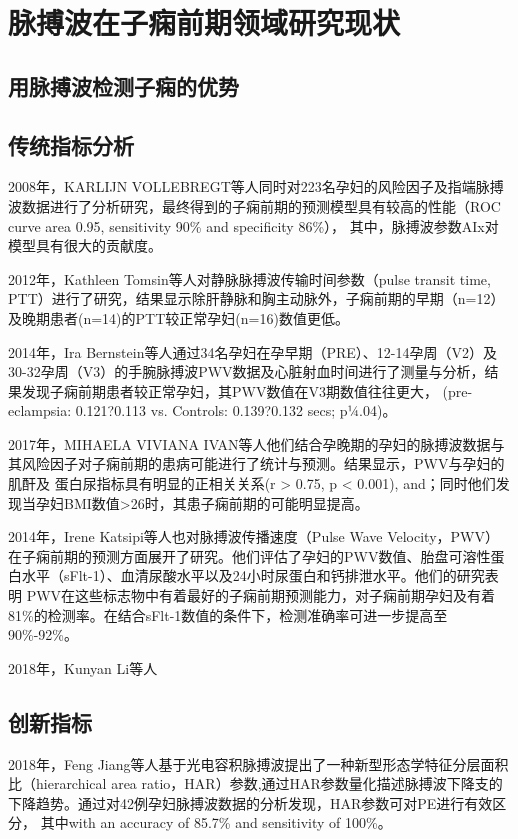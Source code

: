 \section{脉搏波在子痫前期领域研究现状}
\subsection{用脉搏波检测子痫的优势}

\subsection{传统指标分析}

2008年，KARLIJN VOLLEBREGT等人\cite{KARLIJN2008}同时对223名孕妇的风险因子及指端脉搏波数据进行了分析研究，最终得到的子痫前期的预测模型具有较高的性能（ROC curve area 0.95, sensitivity 90\% and specificity 86\%），
其中，脉搏波参数AIx对模型具有很大的贡献度。

2012年，Kathleen Tomsin等人\cite{Tomsin2012}对静脉脉搏波传输时间参数（pulse transit time, PTT）进行了研究，结果显示除肝静脉和胸主动脉外，子痫前期的早期（n=12）及晚期患者(n=14)的PTT较正常孕妇(n=16)数值更低。

2014年，Ira Bernstein等\cite{Ira2014}人通过34名孕妇在孕早期（PRE）、12-14孕周（V2）及30-32孕周（V3）的手腕脉搏波PWV数据及心脏射血时间进行了测量与分析，结果发现子痫前期患者较正常孕妇，其PWV数值在V3期数值往往更大，
(pre- eclampsia: 0.121?0.113 vs. Controls: 0.139?0.132 secs; p¼.04)。

2017年，MIHAELA VIVIANA IVAN等人\cite{VivianaIvan2018}他们结合孕晚期的孕妇的脉搏波数据与其风险因子对子痫前期的患病可能进行了统计与预测。结果显示，PWV与孕妇的肌酐及
蛋白尿指标具有明显的正相关关系(r > 0.75, p < 0.001), and；同时他们发现当孕妇BMI数值>26时，其患子痫前期的可能明显提高。

2014年，Irene Katsipi等人\cite{Katsipi2014}也对脉搏波传播速度（Pulse Wave Velocity，PWV）在子痫前期的预测方面展开了研究。他们评估了孕妇的PWV数值、胎盘可溶性蛋白水平（sFlt-1）、血清尿酸水平以及24小时尿蛋白和钙排泄水平。他们的研究表明
PWV在这些标志物中有着最好的子痫前期预测能力，对子痫前期孕妇及有着81\%的检测率。在结合sFlt-1数值的条件下，检测准确率可进一步提高至90\%-92\%。

2018年，Kunyan Li等人

\subsection{创新指标}

2018年，Feng Jiang等人\cite{FengJiang2018,ChenH2019}基于光电容积脉搏波提出了一种新型形态学特征分层面积比（hierarchical area ratio，HAR）参数,通过HAR参数量化描述脉搏波下降支的下降趋势。通过对42例孕妇脉搏波数据的分析发现，HAR参数可对PE进行有效区分，
其中with an accuracy of 85.7\% and sensitivity of 100\%。

